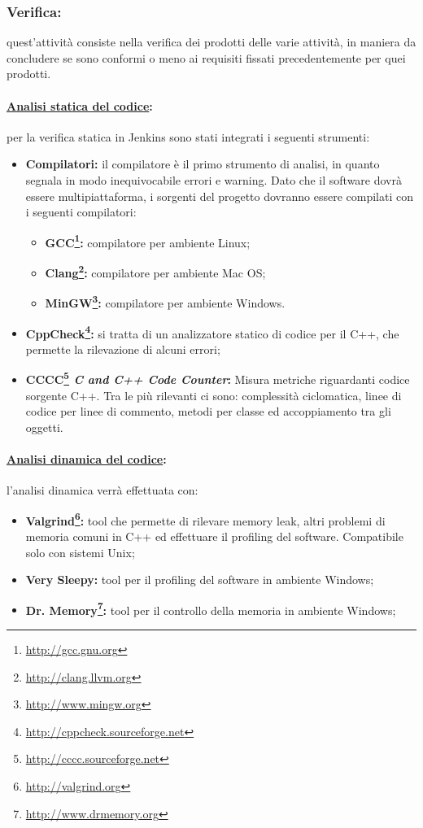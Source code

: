 \subsubsection{Verifica:}
\label{verifica}
quest'attività consiste nella verifica dei prodotti delle varie attività, in maniera da concludere se sono conformi o meno ai requisiti fissati precedentemente per quei prodotti.

\paragraph{\underline{Analisi statica del codice}:}
per la verifica statica in Jenkins sono stati integrati i seguenti strumenti:
\begin{itemize}
\item\textbf{Compilatori:} il compilatore è il primo strumento di analisi, in quanto segnala in modo inequivocabile errori e warning. Dato che il software dovrà essere multipiattaforma, i sorgenti del progetto dovranno essere compilati con i seguenti compilatori:
\begin{itemize}
\item\textbf{GCC\footnote{\url{http://gcc.gnu.org}}:} compilatore per ambiente Linux\glossario{};
\item\textbf{Clang\footnote{\url{http://clang.llvm.org}}:} compilatore per ambiente Mac OS\glossario{};
\item\textbf{MinGW\footnote{\url{http://www.mingw.org}}:} compilatore per ambiente Windows\glossario{}.
\end{itemize}
\item\textbf{CppCheck\footnote{\url{http://cppcheck.sourceforge.net}}:} si tratta di un analizzatore statico di codice per il C++\glossario{}, che permette la rilevazione di alcuni errori;
\item \textbf{CCCC\footnote{\url{http://cccc.sourceforge.net}} \textit{C and C++ Code Counter}:} Misura metriche riguardanti codice sorgente C++\g{}. Tra le più rilevanti ci sono: complessità ciclomatica, linee di codice per linee di commento, metodi per classe ed accoppiamento tra gli oggetti.
\end{itemize}

\paragraph{\underline{Analisi dinamica del codice}:}
l'analisi dinamica verrà effettuata con:
\begin{itemize}
\item\textbf{Valgrind\footnote{\url{http://valgrind.org}}:} tool\glossario{} che permette di rilevare memory leak\glossario{}, altri problemi di memoria comuni in C++\glossario{} ed effettuare il profiling\glossario{} del software. Compatibile solo con sistemi Unix;
\item\textbf{Very Sleepy:} tool per il profiling\glossario{} del software in ambiente Windows\glossario{};
\item\textbf{Dr. Memory\footnote{\url{http://www.drmemory.org}}:} tool per il controllo della memoria in ambiente Windows\glossario{};
\end{itemize}


